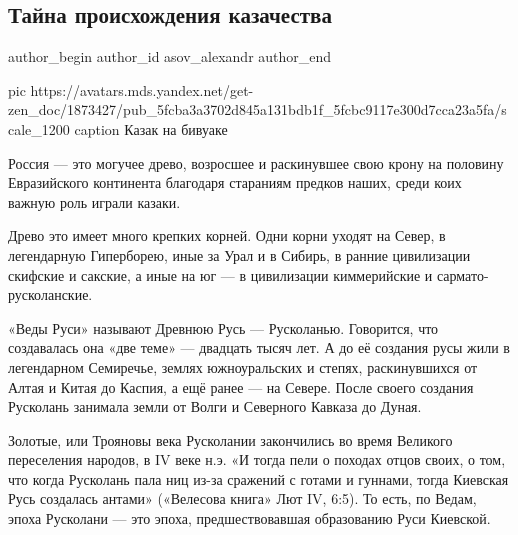  
 
 
 
 
 
\subsection{Тайна происхождения казачества}
\label{sec:07_12_2020.sites.ru.zen_yandex.asov_alexandr.1.tajna_kazachestvo}
\ifcmt
	author_begin
   author_id asov_alexandr
	author_end
\fi


\ifcmt
  pic https://avatars.mds.yandex.net/get-zen_doc/1873427/pub_5fcba3a3702d845a131bdb1f_5fcbc9117e300d7cca23a5fa/scale_1200
	caption Казак на бивуаке
\fi


Россия — это могучее древо, возросшее и раскинувшее свою крону на половину
Евразийского континента благодаря стараниям предков наших, среди коих важную
роль играли казаки.

Древо это имеет много крепких корней. Одни корни уходят на Север, в легендарную
Гиперборею, иные за Урал и в Сибирь, в ранние цивилизации скифские и сакские, а
иные на юг — в цивилизации киммерийские и сармато-русколанские.

«Веды Руси» называют Древнюю Русь — Русколанью. Говорится, что создавалась она
«две теме» — двадцать тысяч лет. А до её создания русы жили в легендарном
Семиречье, землях южноуральских и степях, раскинувшихся от Алтая и Китая до
Каспия, а ещё ранее — на Севере. После своего создания Русколань занимала земли
от Волги и Северного Кавказа до Дуная.

Золотые, или Трояновы века Русколании закончились во время Великого переселения
народов, в IV веке н.э. «И тогда пели о походах отцов своих, о том, что когда
Русколань пала ниц из-за сражений с готами и гуннами, тогда Киевская Русь
создалась антами» («Велесова книга» Лют IV, 6:5). То есть, по Ведам, эпоха
Русколани — это эпоха, предшествовавшая образованию Руси Киевской.

